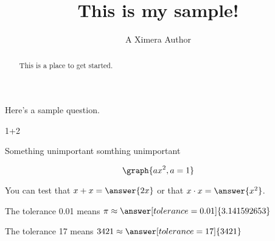 \documentclass{ximera}
\title{This is my sample!}
\author{A Ximera Author}
\begin{document}
\begin{abstract}
  This is a place to get started.
\end{abstract}
\maketitle

Here's a sample question.
\begin{problem}


\begin{sageCell}1+2\end{sageCell}
\begin{foldable}
 Something unimportant  somthing
unimportant 
\end{foldable}
   \[ 
   \graph{ax^2, a=1}
   \]
\end{problem}

\begin{problem}
\begin{multipleChoice}
\end{multipleChoice}
\end{problem}

\begin{problem}
   You can test that $x + x = \answer{2x}$ or that $x \cdot x = \answer{x^2}$.
\end{problem}

\begin{problem}
   The tolerance 0.01 means $\pi \approx \answer[tolerance=0.01]{3.141592653}$
\end{problem}

\begin{problem}
   The tolerance 17 means $3421 \approx \answer[tolerance=17]{3421}$
\end{problem}
\end{document}
